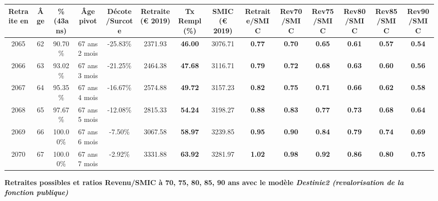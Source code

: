 \begin{adjustbox}{max width=\textwidth} 
\begin{tabular}[htb]{|c|c||c|c|c||c|c||c||c|c|c|c|c|c|} 
\hline 
 Retraite en &  Âge &  \%(43ans) &  Âge pivot &  Décote/Surcote &  Retraite (\euro{} 2019) &  Tx Rempl(\%) &  SMIC (\euro{} 2019) &  Retraite/SMIC &  Rev70/SMIC &  Rev75/SMIC &  Rev80/SMIC &  Rev85/SMIC &  Rev90/SMIC \\ 
\hline \hline 
 2065 &  62 &  90.70\% &  67 ans 2 mois &  -25.83\% &  2371.93 &  {\bf 46.00} &  3076.71 &  {\bf {\color{red} 0.77}} &  {\bf {\color{red} 0.70}} &  {\bf {\color{red} 0.65}} &  {\bf {\color{red} 0.61}} &  {\bf {\color{red} 0.57}} &  {\bf {\color{red} 0.54}} \\ 
\hline 
 2066 &  63 &  93.02\% &  67 ans 3 mois &  -21.25\% &  2464.38 &  {\bf 47.68} &  3116.71 &  {\bf {\color{red} 0.79}} &  {\bf {\color{red} 0.72}} &  {\bf {\color{red} 0.68}} &  {\bf {\color{red} 0.63}} &  {\bf {\color{red} 0.60}} &  {\bf {\color{red} 0.56}} \\ 
\hline 
 2067 &  64 &  95.35\% &  67 ans 4 mois &  -16.67\% &  2574.88 &  {\bf 49.72} &  3157.23 &  {\bf {\color{red} 0.82}} &  {\bf {\color{red} 0.75}} &  {\bf {\color{red} 0.71}} &  {\bf {\color{red} 0.66}} &  {\bf {\color{red} 0.62}} &  {\bf {\color{red} 0.58}} \\ 
\hline 
 2068 &  65 &  97.67\% &  67 ans 5 mois &  -12.08\% &  2815.33 &  {\bf 54.24} &  3198.27 &  {\bf {\color{red} 0.88}} &  {\bf {\color{red} 0.83}} &  {\bf {\color{red} 0.77}} &  {\bf {\color{red} 0.73}} &  {\bf {\color{red} 0.68}} &  {\bf {\color{red} 0.64}} \\ 
\hline 
 2069 &  66 &  100.00\% &  67 ans 6 mois &  -7.50\% &  3067.58 &  {\bf 58.97} &  3239.85 &  {\bf {\color{red} 0.95}} &  {\bf {\color{red} 0.90}} &  {\bf {\color{red} 0.84}} &  {\bf {\color{red} 0.79}} &  {\bf {\color{red} 0.74}} &  {\bf {\color{red} 0.69}} \\ 
\hline 
 2070 &  67 &  100.00\% &  67 ans 7 mois &  -2.92\% &  3331.88 &  {\bf 63.92} &  3281.97 &  {\bf 1.02} &  {\bf {\color{red} 0.98}} &  {\bf {\color{red} 0.92}} &  {\bf {\color{red} 0.86}} &  {\bf {\color{red} 0.80}} &  {\bf {\color{red} 0.75}} \\ 
\hline 
\hline 
\end{tabular} 
\end{adjustbox} 
 
 \vspace{0.1cm} 
{\bf \noindent Retraites possibles et ratios Revenu/SMIC à 70, 75, 80, 85, 90 ans avec le modèle \emph{Destinie2 (revalorisation de la fonction publique)}}  
 

